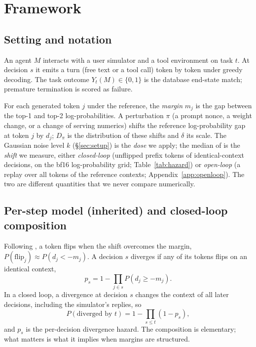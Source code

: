 \section{Framework}
\label{sec:framework}

\subsection{Setting and notation}
An agent $M$ interacts with a user simulator and a tool environment on task $t$. At decision $s$ it emits a turn (free text or a tool call) token by token under greedy decoding. The task outcome $Y_t(M) \in \{0,1\}$ is the database end-state match; premature termination is scored as failure.

For each generated token $j$ under the reference, the \emph{margin} $m_j$ is the gap between the top-1 and top-2 log-probabilities. A perturbation $\pi$ (a prompt nonce, a weight change, or a change of serving numerics) shifts the reference log-probability gap at token $j$ by $d_j$; $D_\pi$ is the distribution of these shifts and $\delta$ its scale. The Gaussian noise level $k$ (\S\ref{sec:setup}) is the \emph{dose} we apply; the median of \absd{} is the \emph{shift} we measure, either \emph{closed-loop} (unflipped prefix tokens of identical-context decisions, on the bf16 log-probability grid; Table~\ref{tab:hazard}) or \emph{open-loop} (a replay over all tokens of the reference contexts; Appendix~\ref{app:openloop}). The two are different quantities that we never compare numerically.

\subsection{Per-step model (inherited) and closed-loop composition}
Following \citet{du2026greedy}, a token flips when the shift overcomes the margin, $P(\text{flip}_j) \approx P(d_j < -m_j)$. A decision $s$ diverges if any of its tokens flips on an identical context,
\begin{equation}
p_s = 1 - \textstyle\prod_{j \in s} P(d_j \ge -m_j).
\end{equation}
In a closed loop, a divergence at decision $s$ changes the context of all later decisions, including the simulator's replies, so
\begin{equation}
P(\text{diverged by } t) = 1 - \textstyle\prod_{s \le t} (1 - p_s),
\end{equation}
and $p_s$ is the per-decision divergence hazard. The composition is elementary; what matters is what it implies when margins are structured.

